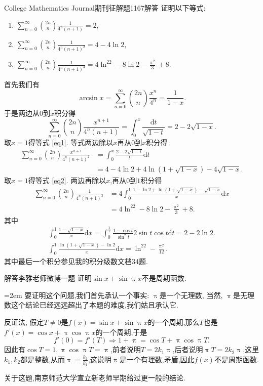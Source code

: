 \documentclass[UTF8,no-math,12pt,openany,table,dvipsnames,svgnames]{book}
\renewcommand{\pi}{\uppi}
\newcommand{\hei}{\CJKfamily{hei}}
\newenvironment{Proof}{\par\indent{\hei 证明}\hspace{1em}}{\par}
\begin{document}
\begin{MYBOX}[colbacktitle=blue]{College Mathematics Journal期刊征解题1167解答}
证明以下等式:
\begin{enumerate}
  \item \label{eq1} $\sum_{n=0}^\infty\binom{2n}n\frac1{4^n(n+1)}=2$,
  \item \label{eq2} $\sum_{n=0}^\infty\binom{2n}n\frac1{4^n(n+1)^2}=4-4\ln2$,
  \item \label{eq3} $\sum_{n=0}^\infty\binom{2n}n\frac1{4^n(n+1)^3}=4\ln^22-8\ln2-
  \frac{\pi^2}3+8$.
\end{enumerate}
\tcblower
\begin{Proof}
首先我们有
\[\arcsin x=\sum_{n=0}^\infty\binom{2n}n\frac{x^n}{4^n}=\frac1{1-x}.\]
于是两边从$0$到$x$积分得
\[\sum_{n=0}^\infty\binom{2n}n\frac{x^{n+1}}{4^n(n+1)}=\int_0^x\frac{\mathrm dt}
{\sqrt{1-t}}=2-2\sqrt{1-x}.\]
取$x=1$得等式 \ref{eq1}. 等式两边除以$x$再从$0$到$x$积分得
\begin{align*}
\sum_{n=0}^\infty\binom{2n}n\frac{x^{n+1}}{4^n(n+1)^2}&=
\int_0^x\frac{2-2\sqrt{1-t}}t\mathrm dt\\
&=4-4\ln2+4\ln\left(1+\sqrt{1-x}\right)-4\sqrt{1-x}.
\end{align*}
取$x=1$得等式 \ref{eq2}. 两边再除以$x$,再从$0$到$1$积分得
\begin{align*}
\sum_{n=0}^\infty\binom{2n}n\frac{1}{4^n(n+1)^3}&=
4\int_0^1\frac{1-\ln2+\ln\left(1+\sqrt{1-x}\right)-\sqrt{1-x}}x\mathrm dx\\
&=4\ln^22-8\ln2-\frac{\pi^2}3+8.
\end{align*}
其中
\begin{gather*}
\int_0^1\frac{1-\sqrt{1-x}}x\mathrm dx
=\int_0^{\frac\pi2}\frac{1-\cos t}{\sin^2t}2\sin t\cos t\mathrm dt=2-2\ln2.\\
\int_0^1\frac{\ln\left(1+\sqrt{1-x}\right)-\ln2}x\mathrm dx=\ln^22-\frac{\pi^2}{12}.
\end{gather*}
其中最后一个积分参见我的积分级数文档34题.
\end{Proof}


\end{MYBOX}
\begin{MYBOX}[colbacktitle=blue]{解答李雅老师微博一题}
证明$\sin x+\sin\pi x$不是周期函数.
\tcblower
\begin{Proof}\parindent=2em
要证明这个问题,我们首先承认一个事实: $\pi$是一个无理数, 当然, $\pi$是无理数这个结论已经远远超出了本题的难度,我们姑且承认它.

反证法, 假定$T\ne0$是$f(x)=\sin x+\sin \pi x$的一个周期,那么$T$也是$f'(x)=\cos x+\pi\cos\pi x$的一个周期,于是
\[f'(0)=f'(T)\Rightarrow1+\pi=\cos T+\pi\cos\pi T.\]
因此有$\cos T=1,\pi\cos\pi T=\pi$,前者说明$T=2k_1\pi$,后者说明$\pi T=2k_2\pi$,这里$k_1,k_2$都是整数,从而$\pi=\frac{k_2}{k_1}$,这说明$\pi$是一个有理数,矛盾,因此$f(x)$不是周期函数.

关于这题,南京师范大学宣立新老师早期给过更一般的结论.
\end{Proof}
\end{MYBOX}
\end{document}
